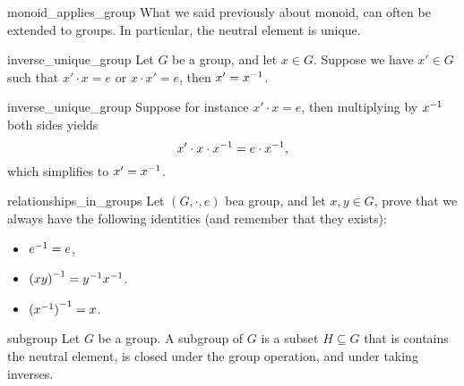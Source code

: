 \begin{crem}{}{monoid_applies_group}
    What we said previously about monoid, can often be extended to groups. In particular, the neutral element is unique.
\end{crem}

\begin{clem}{}{inverse_unique_group}
    Let \( G \) be a group, and let \( x \in G \). Suppose we have \( x' \in G \) such that \( x' \cdot x = e \) or \( x \cdot x' = e \), then \( x' = {x}^{-1} \).
\end{clem}
\begin{lemproof}{inverse_unique_group}
    Suppose for instance \( x' \cdot x = e \), then multiplying by \( {x}^{-1} \) both sides yields
    \begin{equation*}
        x' \cdot x \cdot {x}^{-1} = e \cdot {x}^{-1},
    \end{equation*}
    which simplifies to \( x' = {x}^{-1} \). 
\end{lemproof}

\begin{cex}{}{relationships_in_groups}
    Let \( (G, \cdot, e) \) bea group, and let \( x, y \in G \), prove that we always have the following identities (and remember that they exists):
    \begin{itemize}
        \item \( {e}^{-1} = e \),
        \item \( {(xy)}^{-1} = {y}^{-1} {x}^{-1} \).
        \item \( {({x}^{-1})}^{-1} = x \).
    \end{itemize} 
\end{cex}

\begin{cdef}{}{subgroup}
    Let \( G \) be a group. A subgroup of \( G \) is a subset \( H \subseteq G \) that is contains the neutral element, is closed under the group operation, and under taking inverses.
\end{cdef}

